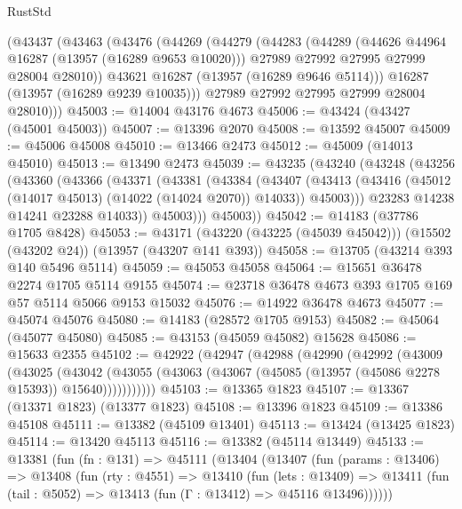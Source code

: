 \begin{lexlean}{RustStd}
\begin{coremodule}
    (@43437
      (@43463
        (@43476
          (@44269
            (@44279
              (@44283
                (@44289
                  (@44626 @44964 @16287 (@13957 (@16289 @9653 @10020)))
                  @27989
                  @27992
                  @27995
                  @27999
                  @28004
                  @28010))
              @43621
              @16287
              (@13957 (@16289 @9646 @5114)))
            @16287
            (@13957 (@16289 @9239 @10035)))
          @27989
          @27992
          @27995
          @27999
          @28004
          @28010)))
@45003 := @14004 @43176 @4673
@45006 := @43424 (@43427 (@45001 @45003))
@45007 := @13396 @2070
@45008 := @13592 @45007
@45009 := @45006 @45008
@45010 := @13466 @2473
@45012 := @45009 (@14013 @45010)
@45013 := @13490 @2473
@45039 := @43235
    (@43240
      (@43248
        (@43256
          (@43360
            (@43366
              (@43371
                (@43381
                  (@43384
                    (@43407
                      (@43413
                        (@43416 (@45012 (@14017 @45013) (@14022 (@14024 @2070)) @14033))
                        @45003)))
                  @23283
                  @14238
                  @14241
                  @23288
                  @14033))
              @45003)))
        @45003))
@45042 := @14183 (@37786 @1705 @8428)
@45053 := @43171 (@43220 (@43225 (@45039 @45042))) (@15502 (@43202 @24)) (@13957 (@43207 @141 @393))
@45058 := @13705 (@43214 @393 @140 @5496 @5114)
@45059 := @45053 @45058
@45064 := @15651 @36478 @2274 @1705 @5114 @9155
@45074 := @23718 @36478 @4673 @393 @1705 @169 @57 @5114 @5066 @9153 @15032
@45076 := @14922 @36478 @4673
@45077 := @45074 @45076
@45080 := @14183 (@28572 @1705 @9153)
@45082 := @45064 (@45077 @45080)
@45085 := @43153 (@45059 @45082) @15628
@45086 := @15633 @2355
@45102 := @42922
    (@42947
      (@42988
        (@42990
          (@42992
            (@43009
              (@43025
                (@43042
                  (@43055 (@43063 (@43067 (@45085 (@13957 (@45086 @2278 @15393)) @15640)))))))))))
@45103 := @13365 @1823
@45107 := @13367 (@13371 @1823) (@13377 @1823)
@45108 := @13396 @1823
@45109 := @13386 @45108
@45111 := @13382 (@45109 @13401)
@45113 := @13424 (@13425 @1823)
@45114 := @13420 @45113
@45116 := @13382 (@45114 @13449)
@45133 := @13381
    (fun (fn : @131) =>
    @45111
      (@13404
        (@13407
          (fun (params : @13406) =>
          @13408
            (fun (rty : @4551) =>
            @13410
              (fun (lets : @13409) =>
              @13411 (fun (tail : @5052) => @13413 (fun (Γ : @13412) => @45116 @13496))))))

\end{coremodule}
\end{lexlean}
